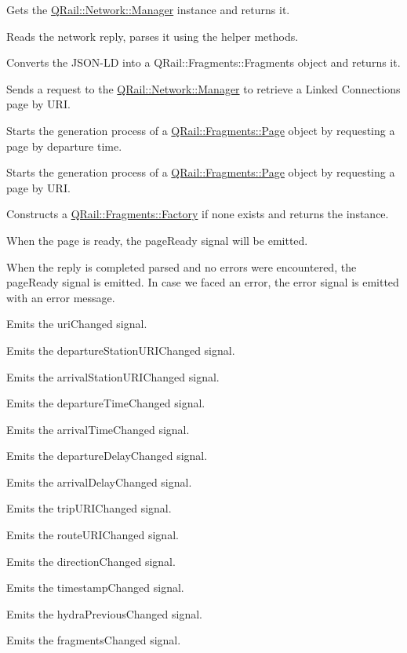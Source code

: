 Gets the \mbox{\hyperlink{classQRail_1_1Network_1_1Manager}{Q\+Rail\+::\+Network\+::\+Manager}} instance and returns it.

Reads the network reply, parses it using the helper methods.

Converts the J\+S\+O\+N-\/\+LD into a Q\+Rail\+::\+Fragments\+::\+Fragments object and returns it.

Sends a request to the \mbox{\hyperlink{classQRail_1_1Network_1_1Manager}{Q\+Rail\+::\+Network\+::\+Manager}} to retrieve a Linked Connections page by U\+RI.

Starts the generation process of a \mbox{\hyperlink{classQRail_1_1Fragments_1_1Page}{Q\+Rail\+::\+Fragments\+::\+Page}} object by requesting a page by departure time.

Starts the generation process of a \mbox{\hyperlink{classQRail_1_1Fragments_1_1Page}{Q\+Rail\+::\+Fragments\+::\+Page}} object by requesting a page by U\+RI.

Constructs a \mbox{\hyperlink{classQRail_1_1Fragments_1_1Factory}{Q\+Rail\+::\+Fragments\+::\+Factory}} if none exists and returns the instance.

When the page is ready, the page\+Ready signal will be emitted.

When the reply is completed parsed and no errors were encountered, the page\+Ready signal is emitted. In case we faced an error, the error signal is emitted with an error message.

Emits the uri\+Changed signal.

Emits the departure\+Station\+U\+R\+I\+Changed signal.

Emits the arrival\+Station\+U\+R\+I\+Changed signal.

Emits the departure\+Time\+Changed signal.

Emits the arrival\+Time\+Changed signal.

Emits the departure\+Delay\+Changed signal.

Emits the arrival\+Delay\+Changed signal.

Emits the trip\+U\+R\+I\+Changed signal.

Emits the route\+U\+R\+I\+Changed signal.

Emits the direction\+Changed signal.

Emits the timestamp\+Changed signal.

Emits the hydra\+Previous\+Changed signal.

Emits the fragments\+Changed signal. 